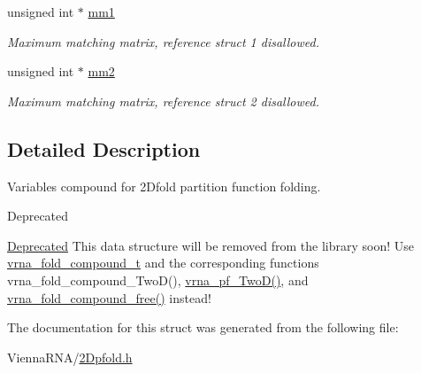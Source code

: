 \begin{DoxyCompactItemize}
\mbox{\label{structTwoDpfold__vars_a7c9e9af6224d4696118e05835441863d}} 
unsigned int $\ast$ \hyperlink{structTwoDpfold__vars_a7c9e9af6224d4696118e05835441863d}{mm1}
\begin{DoxyCompactList}\small\item\em Maximum matching matrix, reference struct 1 disallowed. \end{DoxyCompactList}\item 
\mbox{\label{structTwoDpfold__vars_affb913470783f9edb12a0bfc22466269}} 
unsigned int $\ast$ \hyperlink{structTwoDpfold__vars_affb913470783f9edb12a0bfc22466269}{mm2}
\begin{DoxyCompactList}\small\item\em Maximum matching matrix, reference struct 2 disallowed. \end{DoxyCompactList}\end{DoxyCompactItemize}


\subsection{Detailed Description}
Variables compound for 2\+Dfold partition function folding. 

\begin{DoxyRefDesc}{Deprecated}
\item[\hyperlink{deprecated__deprecated000006}{Deprecated}]This data structure will be removed from the library soon! Use \hyperlink{group__fold__compound_ga1b0cef17fd40466cef5968eaeeff6166}{vrna\+\_\+fold\+\_\+compound\+\_\+t} and the corresponding functions vrna\+\_\+fold\+\_\+compound\+\_\+\+Two\+D(), \hyperlink{group__kl__neighborhood__pf_ga0bc3427689bd09da09b8b3094a27f836}{vrna\+\_\+pf\+\_\+\+Two\+D()}, and \hyperlink{group__fold__compound_gadded6039d63f5d6509836e20321534ad}{vrna\+\_\+fold\+\_\+compound\+\_\+free()} instead! \end{DoxyRefDesc}


The documentation for this struct was generated from the following file\+:\begin{DoxyCompactItemize}
\item 
Vienna\+R\+N\+A/\hyperlink{2Dpfold_8h}{2\+Dpfold.\+h}\end{DoxyCompactItemize}
